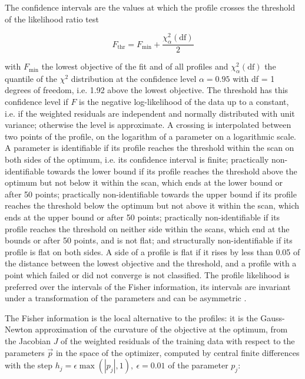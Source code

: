 \documentclass{article}
\begin{document}
The confidence intervals are the values at which the profile crosses the threshold of the likelihood ratio test

\begin{equation}
F_{\mathrm{thr}} = F_{\min} + \frac{\chi^2_{\alpha}(\mathrm{df})}{2}
\end{equation}

with $F_{\min}$ the lowest objective of the fit and of all profiles and $\chi^2_{\alpha}(\mathrm{df})$ the quantile of the $\chi^2$ distribution at the confidence level $\alpha = 0.95$ with df = 1 degrees of freedom, i.e. 1.92 above the lowest objective. The threshold has this confidence level if $F$ is the negative log-likelihood of the data up to a constant, i.e. if the weighted residuals are independent and normally distributed with unit variance; otherwise the level is approximate. A crossing is interpolated between two points of the profile, on the logarithm of a parameter on a logarithmic scale. A parameter is identifiable if its profile reaches the threshold within the scan on both sides of the optimum, i.e. its confidence interval is finite; practically non-identifiable towards the lower bound if its profile reaches the threshold above the optimum but not below it within the scan, which ends at the lower bound or after 50 points; practically non-identifiable towards the upper bound if its profile reaches the threshold below the optimum but not above it within the scan, which ends at the upper bound or after 50 points; practically non-identifiable if its profile reaches the threshold on neither side within the scans, which end at the bounds or after 50 points, and is not flat; and structurally non-identifiable if its profile is flat on both sides. A side of a profile is flat if it rises by less than 0.05 of the distance between the lowest objective and the threshold, and a profile with a point which failed or did not converge is not classified. The profile likelihood is preferred over the intervals of the Fisher information, its intervals are invariant under a transformation of the parameters and can be asymmetric \cite{Wieland2021}.

The Fisher information is the local alternative to the profiles: it is the Gauss-Newton approximation of the curvature of the objective at the optimum, from the Jacobian $J$ of the weighted residuals of the training data with respect to the parameters $\vec{p}$ in the space of the optimizer, computed by central finite differences with the step $h_j = \epsilon \max(|p_j|, 1),\ \epsilon = 0.01$ of the parameter $p_j$:
\end{document}
